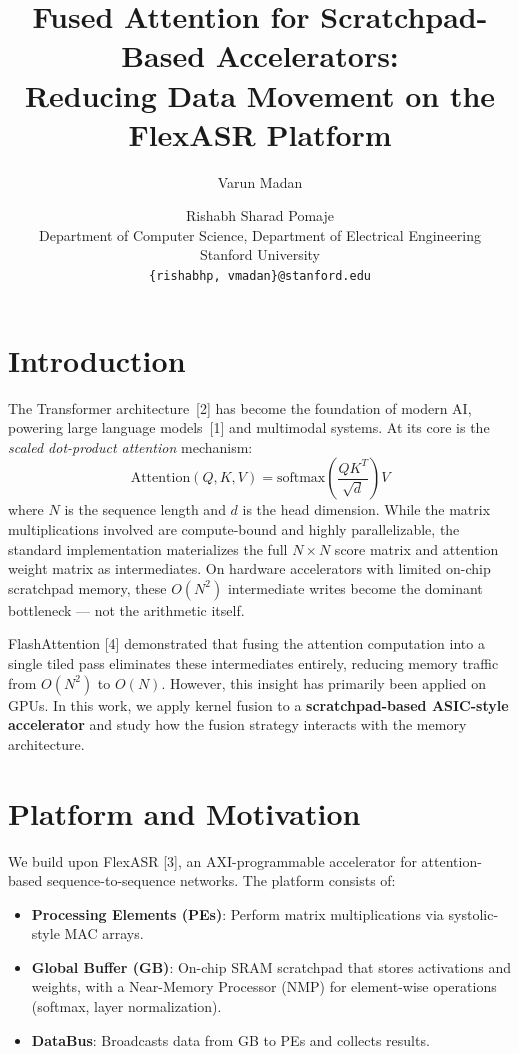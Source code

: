 \documentclass{article}
\title{Fused Attention for Scratchpad-Based Accelerators:\\Reducing Data Movement on the FlexASR Platform}
\author{
Varun Madan \and Rishabh Sharad Pomaje \\
Department of Computer Science, Department of Electrical Engineering \\
Stanford University\\
\texttt{\{rishabhp, vmadan\}@stanford.edu}
}
\begin{document}
\maketitle



\section*{Introduction}

The Transformer architecture~[2] has become the foundation of modern AI, powering large language models~[1] and multimodal systems. At its core is the \textit{scaled dot-product attention} mechanism:
\[
\text{Attention}(Q,K,V) =
\text{softmax}
\left(
\frac{QK^T}{\sqrt{d}}
\right)V
\]
where $N$ is the sequence length and $d$ is the head dimension. While the matrix multiplications involved are compute-bound and highly parallelizable, the standard implementation materializes the full $N \times N$ score matrix and attention weight matrix as intermediates. On hardware accelerators with limited on-chip scratchpad memory, these $O(N^2)$ intermediate writes become the dominant bottleneck --- not the arithmetic itself.

FlashAttention [4] demonstrated that fusing the attention computation into a single tiled pass eliminates these intermediates entirely, reducing memory traffic from $O(N^2)$ to $O(N)$. However, this insight has primarily been applied on GPUs. In this work, we apply kernel fusion to a \textbf{scratchpad-based ASIC-style accelerator} and study how the fusion strategy interacts with the memory architecture.



\section*{Platform and Motivation}

We build upon FlexASR [3], an AXI-programmable accelerator for attention-based sequence-to-sequence networks. The platform consists of:

\begin{itemize}
\item \textbf{Processing Elements (PEs)}: Perform matrix multiplications via systolic-style MAC arrays.
\item \textbf{Global Buffer (GB)}: On-chip SRAM scratchpad that stores activations and weights, with a Near-Memory Processor (NMP) for element-wise operations (softmax, layer normalization).
\item \textbf{DataBus}: Broadcasts data from GB to PEs and collects results.
\end{itemize}
\end{document}

